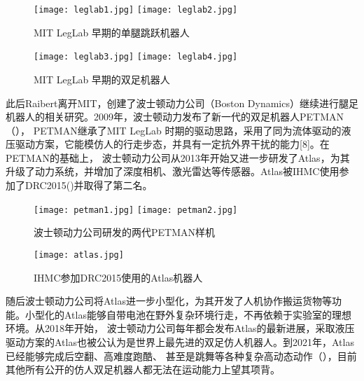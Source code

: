 \begin{figure}[htbp]
    \centering
        {%
            \texttt{[image: leglab1.jpg]}}
        {%
            \texttt{[image: leglab2.jpg]}}
    \caption{MIT LegLab 早期的单腿跳跃机器人\label{fig:leglab}}
\end{figure}
\begin{figure}[htbp]
    \centering
        {%
            \texttt{[image: leglab3.jpg]}}
        {%
            \texttt{[image: leglab4.jpg]}}
    \caption{MIT LegLab 早期的双足机器人\label{fig:leglab_biped}}
\end{figure}

此后Raibert离开MIT，创建了波士顿动力公司（Boston Dynamics）继续进行腿足机器人的相关研究。2009年，波士顿动力发布了新一代的双足机器人PETMAN（），
PETMAN继承了MIT LegLab 时期的驱动思路，采用了同为流体驱动的液压驱动方案，它能模仿人的行走步态，并具有一定抗外界干扰的能力[8]。在PETMAN的基础上，
波士顿动力公司从2013年开始又进一步研发了Atlas，为其升级了动力系统，并增加了深度相机、激光雷达等传感器。Atlas被IHMC使用参加了DRC2015()并取得了第二名。

\begin{figure}[htbp]
    \centering
        {%
            \texttt{[image: petman1.jpg]}}
        {%
            \texttt{[image: petman2.jpg]}}
    \caption{波士顿动力公司研发的两代PETMAN样机\label{fig:leglab_biped}}
\end{figure}
\begin{figure}[htbp]
    \centering
    \texttt{[image: atlas.jpg]}
    \caption{\label{fig:atlas}IHMC参加DRC2015使用的Atlas机器人}
\end{figure}

随后波士顿动力公司将Atlas进一步小型化，为其开发了人机协作搬运货物等功能。小型化的Atlas能够自带电池在野外复杂环境行走，不再依赖于实验室的理想环境。从2018年开始，
波士顿动力公司每年都会发布Atlas的最新进展，采取液压驱动方案的Atlas也被公认为是世界上最先进的双足仿人机器人。到2021年，Atlas已经能够完成后空翻、高难度跑酷、
甚至是跳舞等各种复杂高动态动作（），目前其他所有公开的仿人双足机器人都无法在运动能力上望其项背。

